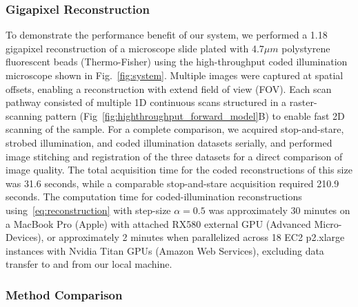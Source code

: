 \subsubsection{Gigapixel Reconstruction}
To demonstrate the performance benefit of our system, we performed a 1.18 gigapixel reconstruction of a microscope slide plated with 4.7$\mu m$ polystyrene fluorescent beads (Thermo-Fisher) using the high-throughput coded illumination microscope shown in Fig.~\ref{fig:system}. Multiple images were captured at spatial offsets, enabling a reconstruction with extend field of view (FOV). Each scan pathway consisted of multiple 1D continuous scans structured in a raster-scanning pattern (Fig~\ref{fig:highthroughput_forward_model}{B}) to enable fast 2D scanning of the sample. For a complete comparison, we acquired stop-and-stare, strobed illumination, and coded illumination datasets serially, and performed image stitching and registration of the three datasets for a direct comparison of image quality. The total acquisition time for the coded reconstructions of this size was 31.6 seconds, while a comparable stop-and-stare acquisition required 210.9 seconds. The computation time for coded-illumination reconstructions using~\eqref{eq:reconstruction} with step-size $\alpha=0.5$ was approximately 30 minutes on a MacBook Pro (Apple) with attached RX580 external GPU (Advanced Micro-Devices), or approximately 2 minutes when parallelized across 18 EC2 p2.xlarge instances with Nvidia Titan GPUs (Amazon Web Services), excluding data transfer to and from our local machine.

\subsubsection{Method Comparison}\label{sec:highthroughput:method_comparison}


